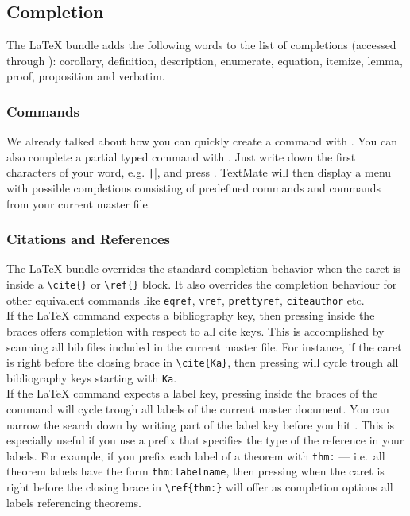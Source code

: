 \documentclass[11pt, x11names]{article}
\begin{document}
\subsection{Completion}

The LaTeX bundle adds the following words to the list of completions (accessed through \keys{\esc}): corollary, definition, description, enumerate, equation, itemize, lemma, proof, proposition and verbatim.

\subsubsection{Commands}

We already talked about how you can quickly create a command with . You can also complete a partial typed command with . Just write down the first characters of your word, e.g. \texttt|\table|, and press \keys{\Alt + \esc}. TextMate will then display a menu with possible completions consisting of predefined commands and commands from your current master file.

\subsubsection{Citations and References}

The LaTeX bundle overrides the standard completion behavior when the caret is inside a \texttt{\textbackslash{}cite\{\}} or \texttt{\textbackslash{}ref\{\}} block. It also overrides the completion behaviour for other equivalent commands like \texttt{eqref}, \texttt{vref}, \texttt{prettyref}, \texttt{citeauthor} etc.\\

If the LaTeX command expects a bibliography key, then pressing \keys{\esc} inside the braces offers completion with respect to all cite keys. This is accomplished by scanning all bib files included in the current master file. For instance, if the caret is right before the closing brace in \texttt{\textbackslash{}cite\{Ka\}}, then pressing \keys{\esc} will cycle trough all bibliography keys starting with \texttt{Ka}.\\

If the LaTeX command expects a label key, pressing \keys{\esc} inside the braces of the command will cycle trough all labels of the current master document. You can narrow the search down by writing part of the label key before you hit \keys{\esc}. This is especially useful if you use a prefix that specifies the type of the reference in your labels. For example, if you prefix each label of a theorem with \texttt{thm:} — i.e.~all theorem labels have the form \texttt{thm:labelname}, then pressing \keys{\esc} when the caret is right before the closing brace in \texttt{\textbackslash{}ref\{thm:\}} will offer as completion options all labels referencing theorems.\\
\end{document}
